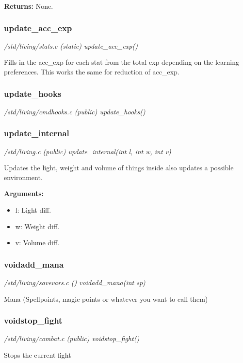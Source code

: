 {\bf Returns:}        None.


\subsubsection{update\_acc\_exp}

{\em /std/living/stats.c (static) update\_acc\_exp()}

Fills in the acc\_exp for each stat from the total exp
depending on the learning preferences. This works the same
for reduction of acc\_exp.


\subsubsection{update\_hooks}

{\em /std/living/cmdhooks.c (public) update\_hooks()}



\subsubsection{update\_internal}

{\em /std/living.c (public) update\_internal(int l, int w, int v)}

Updates the light, weight and volume of things inside
also updates a possible environment.

{\bf Arguments:}
\begin{itemize}
\item      l: Light diff.
\item w: Weight diff.
\item v: Volume diff.
\end{itemize}


\subsubsection{voidadd\_mana}

{\em /std/living/savevars.c () voidadd\_mana(int sp)}

Mana 
(Spellpoints, magic points or whatever you want to call them)


\subsubsection{voidstop\_fight}

{\em /std/living/combat.c (public) voidstop\_fight()}

Stops the current fight


